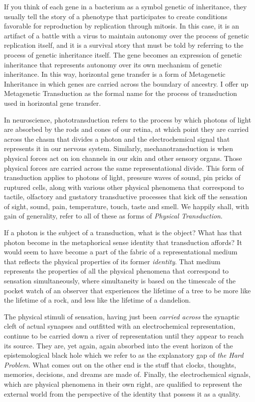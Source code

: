 \documentclass[runningheads]{llncs}
\begin{document}
If you think of each gene in a bacterium as a symbol genetic of inheritance, they usually tell the story of a phenotype that participates to create conditions favorable for reproduction by replication through mitosis. In this case, it is an artifact of a battle with a virus to maintain autonomy over the process of genetic replication itself, and it is a survival story that must be told by referring to the process of genetic inheritance itself. The gene becomes an expression of genetic inheritance that represents autonomy over its own mechanism of genetic inheritance. In this way, horizontal gene transfer is a form of Metagenetic Inheritance in which genes are carried across the boundary of ancestry. I offer up Metagenetic Transduction as the formal name for the process of transduction used in horizontal gene transfer.

In neuroscience, phototransduction refers to the process by which photons of light are absorbed by the rods and cones of our retina, at which point they are carried across the chasm that divides a photon and the electrochemical signal that represents it in our nervous system. Similarly, mechanotransduction is when physical forces act on ion channels in our skin and other sensory organs. Those physical forces are carried across the same representational divide. This form of transduction applies to photons of light, pressure waves of sound, pin pricks of ruptured cells, along with various other physical phenomena that correspond to tactile, olfactory and gustatory transductive processes that kick off the sensation of sight, sound, pain, temperature, touch, taste and smell. We happily shall, with gain of generality, refer to all of these as forms of \emph{Physical Transduction}.

If a photon is the subject of a transduction, what is the object? What has that photon become in the metaphorical sense identity that transduction affords? It would seem to have become a part of the fabric of a representational medium that reflects the physical properties of its former \emph{identity}. That medium represents the properties of all the physical phenomena that correspond to sensation simultaneously, where simultaneity is based on the timescale of the pocket watch of an observer that experiences the lifetime of a tree to be more like the lifetime of a rock, and less like the lifetime of a dandelion.

The physical stimuli of sensation, having just been \emph{carried across} the synaptic cleft of actual synapses and outfitted with an electrochemical representation, continue to be carried down a river of representation until they appear to reach its source. They are, yet again, again absorbed into the event horizon of the epistemological black hole which we refer to as the explanatory gap of \emph{the Hard Problem}. What comes out on the other end is the stuff that clocks, thoughts, memories, decisions, and dreams are made of. Finally, the electrochemical signals, which are physical phenomena in their own right, are qualified to represent the external world from the perspective of the identity that possess it as a quality.
\end{document}
